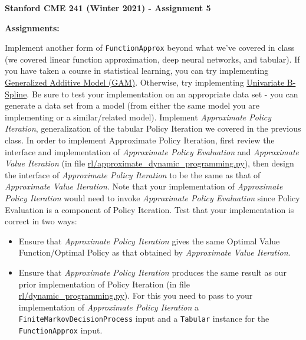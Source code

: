 \documentclass[12pt]{exam}
\begin{document}
\begin{center}
{\large {\bf Stanford CME 241 (Winter 2021) - Assignment 5}}
\end{center}
 
{\large{\bf Assignments:}}
\begin{questions}
	\question Implement another form of \lstinline{FunctionApprox} beyond what we've covered in class (we covered linear function approximation, deep neural networks, and tabular). If you have taken a course in statistical learning, you can try implementing \href{https://en.wikipedia.org/wiki/Generalized_additive_model}{Generalized Additive Model (GAM)}. Otherwise, try implementing \href{https://en.wikipedia.org/wiki/Spline_(mathematics)}{Univariate B-Spline}. Be sure to test your implementation on an appropriate data set - you can generate a data set from a model (from either the same model you are implementing or a similar/related model).
	\question Implement {\em Approximate Policy Iteration}, generalization of the tabular Policy Iteration we covered in the previous class. In order to implement Approximate Policy Iteration, first review the interface and implementation of {\em Approximate Policy Evaluation} and {\em Approximate Value Iteration} (in file \href{https://github.com/TikhonJelvis/RL-book/blob/master/rl/approximate_dynamic_programming.py}{rl\//approximate\_dynamic\_programming.py}), then design the interface of {\em Approximate Policy Iteration} to be the same as that of {\em Approximate Value Iteration}. Note that your implementation of {\em Approximate Policy Iteration} would need to invoke {\em Approximate Policy Evaluation} since Policy Evaluation is a component of Policy Iteration. Test that your implementation is correct in two ways:
	\begin{itemize}
	\item Ensure that {\em Approximate Policy Iteration} gives the same Optimal Value Function/Optimal Policy as that obtained by {\em Approximate Value Iteration}.
	\item Ensure that {\em Approximate Policy Iteration} produces the same result as our prior implementation of Policy Iteration (in file \href{https://github.com/TikhonJelvis/RL-book/blob/master/rl/dynamic_programming.py}{rl\//dynamic\_programming.py}). For this you need to pass to your implementation of {\em Approximate Policy Iteration} a \lstinline{FiniteMarkovDecisionProcess} input and a \lstinline{Tabular} instance for the \lstinline{FunctionApprox} input.
	\end{itemize}
\end{questions}
\end{document}
